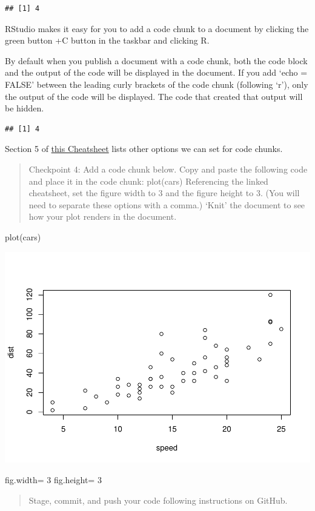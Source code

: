 \documentclass[
]{article}
\newenvironment{Shaded}{\begin{snugshade}}{\end{snugshade}}
\newcommand{\DecValTok}[1]{\textcolor[rgb]{0.00,0.00,0.81}{#1}}
\newcommand{\FunctionTok}[1]{\textcolor[rgb]{0.00,0.00,0.00}{#1}}
\newcommand{\NormalTok}[1]{#1}
\newcommand{\OtherTok}[1]{\textcolor[rgb]{0.56,0.35,0.01}{#1}}
\begin{document}
\begin{verbatim}
## [1] 4
\end{verbatim}

RStudio makes it easy for you to add a code chunk to a document by
clicking the green button +C button in the taskbar and clicking R.

By default when you publish a document with a code chunk, both the code
block and the output of the code will be displayed in the document. If
you add `echo = FALSE' between the leading curly brackets of the code
chunk (following `r'), only the output of the code will be displayed.
The code that created that output will be hidden.

\begin{verbatim}
## [1] 4
\end{verbatim}

Section 5 of
\href{https://www.rstudio.com/wp-content/uploads/2015/02/rmarkdown-cheatsheet.pdf}{this
Cheatsheet} lists other options we can set for code chunks.

\begin{quote}
Checkpoint 4: Add a code chunk below. Copy and paste the following code
and place it in the code chunk: plot(cars) Referencing the linked
cheatsheet, set the figure width to 3 and the figure height to 3. (You
will need to separate these options with a comma.) `Knit' the document
to see how your plot renders in the document.
\end{quote}

\begin{Shaded}
\begin{Highlighting}[]
\FunctionTok{plot}\NormalTok{(cars)}
\end{Highlighting}
\end{Shaded}

\includegraphics{getting-started-nicole_files/figure-latex/unnamed-chunk-3-1.pdf}

\begin{Shaded}
\begin{Highlighting}[]
\NormalTok{fig.width}\OtherTok{=} \DecValTok{3}
\NormalTok{fig.height}\OtherTok{=} \DecValTok{3}
\end{Highlighting}
\end{Shaded}

\begin{quote}
Stage, commit, and push your code following instructions on GitHub.
\end{quote}
\end{document}
